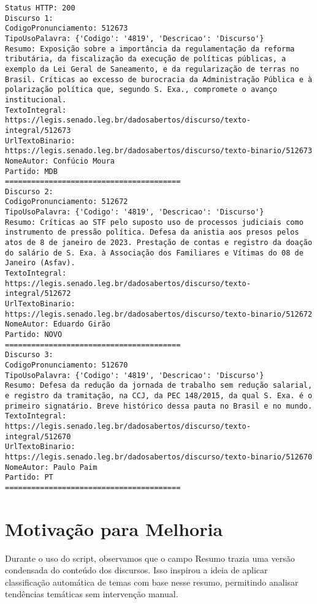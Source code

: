 \documentclass[
]{article}
\begin{document}
\begin{verbatim}
Status HTTP: 200
Discurso 1:
CodigoPronunciamento: 512673
TipoUsoPalavra: {'Codigo': '4819', 'Descricao': 'Discurso'}
Resumo: Exposição sobre a importância da regulamentação da reforma tributária, da fiscalização da execução de políticas públicas, a exemplo da Lei Geral de Saneamento, e da regularização de terras no Brasil. Críticas ao excesso de burocracia da Administração Pública e à polarização política que, segundo S. Exa., compromete o avanço institucional.
TextoIntegral: https://legis.senado.leg.br/dadosabertos/discurso/texto-integral/512673
UrlTextoBinario: https://legis.senado.leg.br/dadosabertos/discurso/texto-binario/512673
NomeAutor: Confúcio Moura
Partido: MDB
========================================
Discurso 2:
CodigoPronunciamento: 512672
TipoUsoPalavra: {'Codigo': '4819', 'Descricao': 'Discurso'}
Resumo: Críticas ao STF pelo suposto uso de processos judiciais como instrumento de pressão política. Defesa da anistia aos presos pelos atos de 8 de janeiro de 2023. Prestação de contas e registro da doação do salário de S. Exa. à Associação dos Familiares e Vítimas do 08 de Janeiro (Asfav).
TextoIntegral: https://legis.senado.leg.br/dadosabertos/discurso/texto-integral/512672
UrlTextoBinario: https://legis.senado.leg.br/dadosabertos/discurso/texto-binario/512672
NomeAutor: Eduardo Girão
Partido: NOVO
========================================
Discurso 3:
CodigoPronunciamento: 512670
TipoUsoPalavra: {'Codigo': '4819', 'Descricao': 'Discurso'}
Resumo: Defesa da redução da jornada de trabalho sem redução salarial, e registro da tramitação, na CCJ, da PEC 148/2015, da qual S. Exa. é o primeiro signatário. Breve histórico dessa pauta no Brasil e no mundo.
TextoIntegral: https://legis.senado.leg.br/dadosabertos/discurso/texto-integral/512670
UrlTextoBinario: https://legis.senado.leg.br/dadosabertos/discurso/texto-binario/512670
NomeAutor: Paulo Paim
Partido: PT
======================================== 
\end{verbatim}

\section{Motivação para Melhoria}\label{motivauxe7uxe3o-para-melhoria}

Durante o uso do script, observamos que o campo Resumo trazia uma versão
condensada do conteúdo dos discursos. Isso inspirou a ideia de aplicar
classificação automática de temas com base nesse resumo, permitindo
analisar tendências temáticas sem intervenção manual.
\end{document}
